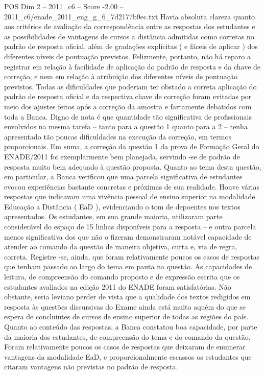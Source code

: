 \begin{textsample}{POS Dim 2 – 2011\_c6 – Score -2.00 – 2011\_c6/enade\_2011\_eng\_g\_6\_7d2177b9ec.txt}
Havia absoluta clareza quanto aos critérios de avaliação da correspondência entre as respostas dos estudantes e as possibilidades de vantagens de cursos a distância admitidas como corretas no padrão de resposta oficial, além de gradações explícitas ( e fáceis de aplicar ) dos diferentes níveis de pontuação previstos.
Felizmente, portanto, não há reparo a registrar em relação à facilidade de aplicação do padrão de resposta e da chave de correção, e nem em relação à atribuição dos diferentes níveis de pontuação previstos.
Todas as dificuldades que poderiam ter obstado a correta aplicação do padrão de resposta oficial e da respectiva chave de correção foram evitadas por meio dos ajustes feitos após a correção da amostra e fartamente debatidos com toda a Banca.
Digno de nota é que quantidade tão significativa de profissionais envolvidos na mesma tarefa – tanto para a questão 1 quanto para a 2 – tenha apresentado tão poucas dificuldades na execução da correção, em termos proporcionais.
Em suma, a correção da questão 1 da prova de Formação Geral do ENADE/2011 foi exemplarmente bem planejada, servindo -se de padrão de resposta muito bem adequado à questão proposta.
Quanto ao tema desta questão, em particular, a Banca verificou que uma parcela significativa de estudantes evocou experiências bastante concretas e próximas de sua realidade.
Houve várias respostas que indicavam uma vivência pessoal de ensino superior na modalidade Educação a Distância ( EaD ), evidenciando o tom de depoentes nos textos apresentados.
Os estudantes, em sua grande maioria, utilizaram parte considerável do espaço de 15 linhas disponíveis para a resposta – e outra parcela menos significativa dos que não o fizeram demonstraram notável capacidade de atender ao comando da questão de maneira objetiva, curta e, via de regra, correta.
Registre -se, ainda, que foram relativamente poucos os casos de respostas que tenham passado ao largo do tema em pauta na questão.
As capacidades de leitura, de compreensão do comando proposto e de expressão escrita que os estudantes avaliados na edição 2011 do ENADE foram satisfatórias.
Não obstante, seria leviano perder de vista que a qualidade dos textos redigidos em resposta às questões discursivas do Exame ainda está muito aquém do que se espera de concluintes de cursos de ensino superior de todas as regiões do país.
Quanto ao conteúdo das respostas, a Banca constatou boa capacidade, por parte da maioria dos estudantes, de compreensão do tema e do comando da questão.
Foram relativamente poucos os casos de respostas que deixaram de enumerar vantagens da modalidade EaD, e proporcionalmente escassos os estudantes que citaram vantagens não previstas no padrão de resposta.

\end{textsample}
